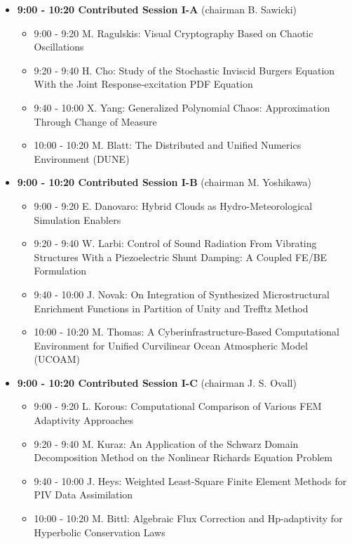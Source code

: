 \documentclass[10pt]{article}%
\begin{document}
\begin{itemize}    
  \item {\bf 9:00 - 10:20 Contributed Session I-A} (chairman B. Sawicki) 
  \begin{itemize}
    \item 9:00 - 9:20 {M. Ragulskis}: {Visual Cryptography Based on Chaotic Oscillations}  %
    \item 9:20 - 9:40 {H. Cho}: {Study of the Stochastic Inviscid Burgers Equation With the Joint Response-excitation PDF Equation}
    \item 9:40 - 10:00 {X. Yang}: {Generalized Polynomial Chaos: Approximation Through Change of Measure}
    \item 10:00 - 10:20 {M. Blatt}: {The Distributed and Unified Numerics Environment (DUNE)}
  \end{itemize}
  \item {\bf 9:00 - 10:20 Contributed Session I-B} (chairman M. Yoshikawa) 
  \begin{itemize}
    \item 9:00 - 9:20 {E. Danovaro}: {Hybrid Clouds as Hydro-Meteorological Simulation Enablers}
    \item 9:20 - 9:40 {W. Larbi}: {Control of Sound Radiation From Vibrating Structures With a Piezoelectric Shunt Damping: A Coupled FE/BE Formulation}
    \item 9:40 - 10:00 {J. Novak}: {On Integration of Synthesized Microstructural Enrichment Functions in Partition of Unity and Trefftz Method}
    \item 10:00 - 10:20 {M. Thomas}: {A Cyberinfrastructure-Based Computational Environment for Unified Curvilinear Ocean Atmospheric Model  (UCOAM)}
  \end{itemize}
    \item {\bf 9:00 - 10:20 Contributed Session I-C} (chairman J. S. Ovall) 
  \begin{itemize}
    \item 9:00 - 9:20 {L. Korous}: {Computational Comparison of Various FEM Adaptivity Approaches}
    \item 9:20 - 9:40 {M. Kuraz}: {An Application of the Schwarz Domain Decomposition Method on the Nonlinear Richards Equation Problem} %
    \item 9:40 - 10:00 {J. Heys}: {Weighted Least-Square Finite Element Methods for PIV Data Assimilation}
    \item 10:00 - 10:20 {M. Bittl}: {Algebraic Flux Correction and Hp-adaptivity for Hyperbolic Conservation Laws}

\end{itemize}
\end{itemize}
\end{document}
